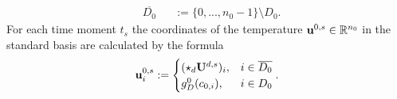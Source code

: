 \begin{algorithm}
\begin{enumerate}
\begin{subequations}
\begin{alignat}{2}
          & \overline{D_0}
          && := \{0, ..., n_0 - 1\} \setminus D_0.
        \end{alignat}
      \end{subequations}
      For each time moment $t_s$ the coordinates of the temperature
      ${\bf u}^{0, s} \in \mathbb{R}^{n_0}$
      in the standard basis are calculated by the formula
      \begin{equation}
        {\bf u}^{0, s}_i :=
        \begin{cases}
          ({\bf \star}_d {\bf U}^{d, s})_i, & i \in \overline{D_0} \\
          g_D^0(c_{0, i}), & i \in D_0
        \end{cases}.
      \end{equation}
  \end{enumerate}
\end{algorithm}
